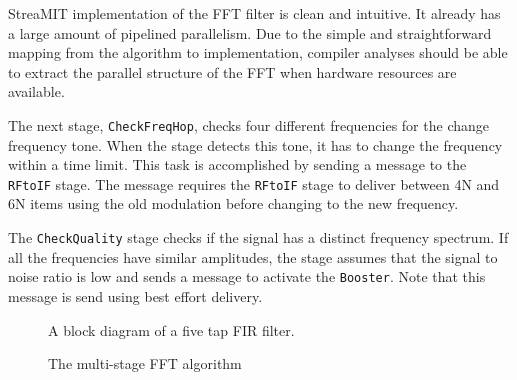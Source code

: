 StreaMIT implementation of the FFT filter is clean and intuitive. It
already has a large amount of pipelined parallelism. Due to the simple
and straightforward mapping from the algorithm to implementation,
compiler analyses should be able to extract the parallel structure of
the FFT when hardware resources are available.

The next stage, {\tt CheckFreqHop}, checks four different frequencies
for the change frequency tone. When the stage detects this tone, it
has to change the frequency within a time limit. This task is
accomplished by sending a message to the {\tt RFtoIF} stage.  The
message requires the {\tt RFtoIF} stage to deliver between 4N and 6N
items using the old modulation before changing to the new frequency.

The {\tt CheckQuality} stage checks if the signal has a distinct
frequency spectrum. If all the frequencies have similar amplitudes,
the stage assumes that the signal to noise ratio is low and sends a
message to activate the {\tt Booster}. Note that this message is send
using best effort delivery.

\begin{figure}
\centering
{}
\caption{A block diagram of a five tap FIR filter.}
\label{fig:firfilter}
\end{figure}

\begin{figure}
\centering
{}
\caption{The multi-stage FFT algorithm}
\label{fig:fftfilter}
\end{figure}

